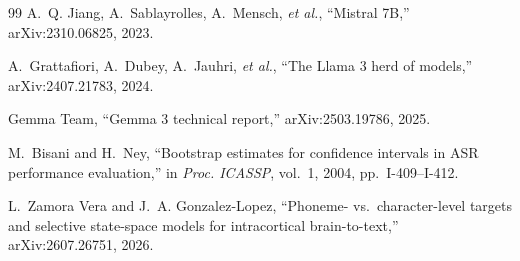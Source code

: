 \documentclass[conference,a4paper,10pt]{IEEEtran}
\begin{document}
\begin{thebibliography}{99}
A.~Q. Jiang, A.~Sablayrolles, A.~Mensch, \textit{et al.}, ``Mistral 7B,'' arXiv:2310.06825, 2023.

A.~Grattafiori, A.~Dubey, A.~Jauhri, \textit{et al.}, ``The Llama 3 herd of models,'' arXiv:2407.21783, 2024.

Gemma Team, ``Gemma 3 technical report,'' arXiv:2503.19786, 2025.

M.~Bisani and H.~Ney, ``Bootstrap estimates for confidence intervals in ASR performance evaluation,'' in \textit{Proc. ICASSP}, vol.~1, 2004, pp.~I-409--I-412.

L.~Zamora Vera and J.~A. Gonzalez-Lopez, ``Phoneme- vs.\ character-level targets and selective state-space models for intracortical brain-to-text,'' arXiv:2607.26751, 2026.

\end{thebibliography}
\end{document}
